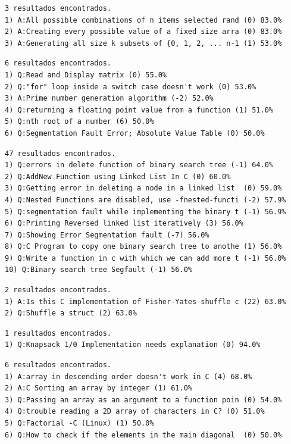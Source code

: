 \begin{lstlisting}[caption={Alexander Bogomolny.},label={lst:alex}]
3 resultados encontrados.
1) A:All possible combinations of n items selected rand (0) 83.0%
2) A:Creating every possible value of a fixed size arra (0) 83.0%
3) A:Generating all size k subsets of {0, 1, 2, ... n-1 (1) 53.0%
\end{lstlisting}

\newpage
\begin{lstlisting}[caption={Bin Packing.},label={lst:binpack}]
6 resultados encontrados.
1) Q:Read and Display matrix (0) 55.0%
2) Q:"for" loop inside a switch case doesn't work (0) 53.0%
3) A:Prime number generation algorithm (-2) 52.0%
4) Q:returning a floating point value from a function (1) 51.0%
5) Q:nth root of a number (6) 50.0%
6) Q:Segmentation Fault Error; Absolute Value Table (0) 50.0%
\end{lstlisting}

\begin{lstlisting}[caption={Binary Search Tree.},label={lst:binsearch}]
47 resultados encontrados.
1) Q:errors in delete function of binary search tree (-1) 64.0%
2) Q:AddNew Function using Linked List In C (0) 60.0%
3) Q:Getting error in deleting a node in a linked list  (0) 59.0%
4) Q:Nested Functions are disabled, use -fnested-functi (-2) 57.9%
5) Q:segmentation fault while implementing the binary t (-1) 56.9%
6) Q:Printing Reversed linked list iteratively (3) 56.0%
7) Q:Showing Error Segmentation fault (-7) 56.0%
8) Q:C Program to copy one binary search tree to anothe (1) 56.0%
9) Q:Write a function in c with which we can add more t (-1) 56.0%
10) Q:Binary search tree Segfault (-1) 56.0%
\end{lstlisting}

\begin{lstlisting}[caption={Fisher Yates.},label={lst:yates}]
2 resultados encontrados.
1) A:Is this C implementation of Fisher-Yates shuffle c (22) 63.0%
2) Q:Shuffle a struct (2) 63.0%
\end{lstlisting}

\begin{lstlisting}[caption={Knapsack Problem.},label={lst:knapsack}]
1 resultados encontrados.
1) Q:Knapsack 1/0 Implementation needs explanation (0) 94.0%
\end{lstlisting}

\newpage
\begin{lstlisting}[caption={Selection Sort.},label={lst:selec}]
6 resultados encontrados.
1) A:array in descending order doesn't work in C (4) 68.0%
2) A:C Sorting an array by integer (1) 61.0%
3) Q:Passing an array as an argument to a function poin (0) 54.0%
4) Q:trouble reading a 2D array of characters in C? (0) 51.0%
5) Q:Factorial -C (Linux) (1) 50.0%
6) Q:How to check if the elements in the main diagonal  (0) 50.0%
\end{lstlisting}

